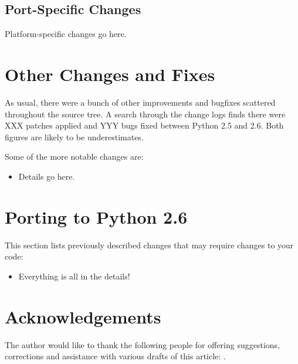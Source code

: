 \documentclass{howto}
\begin{document}
\subsection{Port-Specific Changes}

Platform-specific changes go here.


\section{Other Changes and Fixes \label{section-other}}

As usual, there were a bunch of other improvements and bugfixes
scattered throughout the source tree.  A search through the change
logs finds there were XXX patches applied and YYY bugs fixed between
Python 2.5 and 2.6.  Both figures are likely to be underestimates.

Some of the more notable changes are:

\begin{itemize}

\item Details go here.

\end{itemize}


\section{Porting to Python 2.6}

This section lists previously described changes that may require
changes to your code:

\begin{itemize}

\item Everything is all in the details!

\end{itemize}


\section{Acknowledgements \label{acks}}

The author would like to thank the following people for offering
suggestions, corrections and assistance with various drafts of this
article: .
\end{document}
